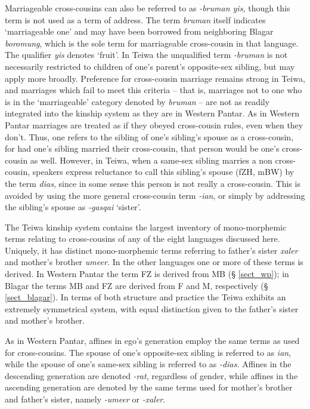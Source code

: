 Marriageable cross-cousins can also be referred to as \textit{-bruman yis,} though this term is not used as a term of address. The term \textit{bruman} itself indicates `marriageable one' and may have been borrowed from neighboring Blagar \textit{boromung}, which is the sole term for marriageable cross-cousin in that language. The qualifier \textit{yis} denotes `fruit'. In Teiwa the unqualified term \textit{-bruman} is not necessarily restricted to children of one's parent's opposite-sex sibling, but may apply more broadly. Preference for cross-cousin marriage remains strong in Teiwa, and marriages which fail to meet this criteria -- that is, marriages not to one who is in the `marriageable' category denoted by \textit{bruman}{} -- are not as readily integrated into the kinship system as they are in Western Pantar. As in Western Pantar marriages are treated as if they obeyed cross-cousin rules, even when they don't. Thus, one refers to the sibling of one's sibling's spouse as a cross-cousin, for had one's sibling married their cross-cousin, that person would be one's cross-cousin as well. However, in Teiwa, when a same-sex sibling marries a non cross-cousin, speakers express reluctance to call this sibling's spouse (fZH, mBW) by the term \textit{dias}, since in some sense this person is not really a cross-cousin. This is avoided by using the more general cross-cousin term \textit{-ian}, or simply by addressing the sibling's spouse as \textit{-gasqai} `sister'. 

The Teiwa kinship system contains the largest inventory of mono-morphemic terms relating to cross-cousins of any of the eight languages discussed here. Uniquely, it has distinct mono-morphemic terms referring to father's sister \textit{xaler} and mother's brother \textit{umeer.} In the other languages one or more of these terms is derived. In Western Pantar the term FZ is derived from MB ({\S} \ref{sect_wp}); in Blagar the terms MB and FZ are derived from F and M, respectively ({\S} \ref{sect_blagar}). In terms of both structure and practice the Teiwa exhibits an extremely symmetrical system, with equal distinction given to the father's sister and mother's brother. 

As in Western Pantar, affines in ego's generation employ the same terms as used for cross-cousins. The spouse of one's opposite-sex sibling is referred to as \textit{ian}, while the spouse of one's same-sex sibling is referred to as \textit{-dias.} Affines in the descending generation are denoted \textit{-rat}, regardless of gender, while affines in the ascending generation are denoted by the same terms used for mother's brother and father's sister, namely \textit{-umeer} or \textit{-xaler}. 


